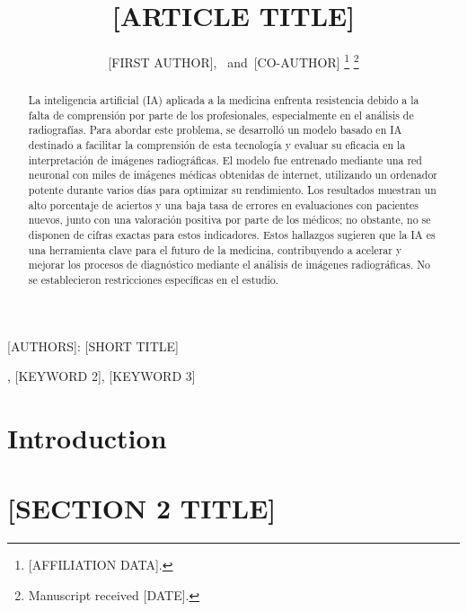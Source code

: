 \documentclass[journal]{IEEEtran}
\begin{document}
\title{[ARTICLE TITLE]}

\author{[FIRST AUTHOR],~
        and~[CO-AUTHOR]%
\thanks{[AFFILIATION DATA].}%
\thanks{Manuscript received [DATE].}}

%
{[AUTHORS]: [SHORT TITLE]}

\maketitle

\begin{abstract}
La inteligencia artificial (IA) aplicada a la medicina enfrenta resistencia debido a la falta de comprensión por parte de los profesionales, especialmente en el análisis de radiografías. Para abordar este problema, se desarrolló un modelo basado en IA destinado a facilitar la comprensión de esta tecnología y evaluar su eficacia en la interpretación de imágenes radiográficas. El modelo fue entrenado mediante una red neuronal con miles de imágenes médicas obtenidas de internet, utilizando un ordenador potente durante varios días para optimizar su rendimiento. Los resultados muestran un alto porcentaje de aciertos y una baja tasa de errores en evaluaciones con pacientes nuevos, junto con una valoración positiva por parte de los médicos; no obstante, no se disponen de cifras exactas para estos indicadores. Estos hallazgos sugieren que la IA es una herramienta clave para el futuro de la medicina, contribuyendo a acelerar y mejorar los procesos de diagnóstico mediante el análisis de imágenes radiográficas. No se establecieron restricciones específicas en el estudio.
\end{abstract}

\begin{IEEEkeywords}
[KEYWORD 1], [KEYWORD 2], [KEYWORD 3]
\end{IEEEkeywords}

\IEEEpeerreviewmaketitle


\section{Introduction}
\label{sec:intro}



\section{[SECTION 2 TITLE]}
\label{sec:section2}
\end{document}
